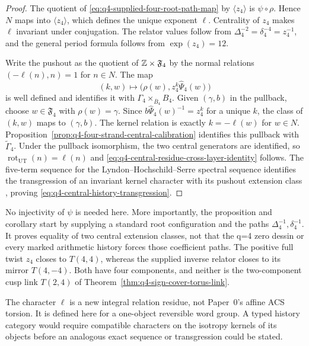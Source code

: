 \begin{proof}
The quotient of \eqref{eq:q4-supplied-four-root-path-map} by
$\langle z_4\rangle$ is $\psi\circ\rho$.  Hence $N$ maps into
$\langle z_4\rangle$, which defines the unique exponent $\ell$.  Centrality of
$z_4$ makes $\ell$ invariant under conjugation.  The relator values follow from
$\Delta_4^{-2}=\delta_4^{-4}=z_4^{-1}$, and the general period formula follows
from $\operatorname{exp}(z_4)=12$.

Write the pushout as the quotient of $\mathbb{Z}\times\mathfrak F_4$ by the normal
relations $(-\ell(n),n)=1$ for $n\in N$.  The map
\begin{equation}
 (k,w)\longmapsto\bigl(\rho(w),z_4^k\widehat\Psi_4(w)\bigr)
 \label{eq:q4-central-history-pushout-map}
\end{equation}
is well defined and identifies it with
$\Gamma_4\mathbin{\times}_{\overline B_4}B_4$.  Given $(\gamma,b)$ in the
pullback, choose $w\in\mathfrak F_4$ with $\rho(w)=\gamma$.  Since
$b\widehat\Psi_4(w)^{-1}=z_4^k$ for a unique $k$, the class of $(k,w)$ maps to
$(\gamma,b)$.  The kernel relation is exactly $k=-\ell(w)$ for $w\in N$.
Proposition~\ref{prop:q4-four-strand-central-calibration}
identifies this pullback with $\widetilde\Gamma_4$.  Under the pullback
isomorphism, the two central generators are identified, so
$\operatorname{rot}_{\mathrm{UT}}(n)=\ell(n)$ and
\eqref{eq:q4-central-residue-cross-layer-identity} follows.  The five-term sequence for
the Lyndon--Hochschild--Serre spectral sequence identifies the transgression of
an invariant kernel character with its pushout extension class
\cite[Chapter~VII]{Brown1982CohomologyGroups}, proving
\eqref{eq:q4-central-history-transgression}.
\end{proof}

No injectivity of $\psi$ is needed here.  More importantly, the proposition
and corollary start by supplying a standard root configuration and the paths
$\Delta_4^{-1},\delta_4^{-1}$.  It proves equality of two central extension
classes, not that the q=4 zero dessin or every marked arithmetic history forces
those coefficient paths.  The positive full twist $z_4$ closes to $T(4,4)$,
whereas the supplied inverse relator closes to its mirror $T(4,-4)$.  Both have
four components, and neither is the two-component cusp link $T(2,4)$ of
Theorem~\ref{thm:q4-sign-cover-torus-link}.

The character $\ell$ is a new integral relation residue, not Paper~0's affine
ACS torsion.  It is defined here for a one-object reversible word group.  A typed
history category would require compatible characters on the isotropy kernels of
its objects before an analogous exact sequence or transgression could be stated.


